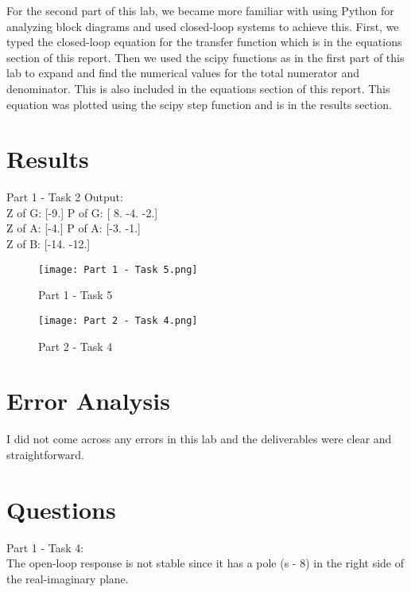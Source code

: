 \documentclass[12pt]{report}
\begin{document}
\noindent For the second part of this lab, we became more familiar with using Python for analyzing block diagrams and used closed-loop systems to achieve this. First, we typed the closed-loop equation for the transfer function which is in the equations section of this report. Then we used the scipy functions as in the first part of this lab to expand and find the numerical values for the total numerator and denominator. This is also included in the equations section of this report. This equation was plotted using the scipy step function and is in the results section. 

\newpage
\section{Results}

Part 1 - Task 2 Output:\\

Z of G:  [-9.]   \indent P of G:  [ 8. -4. -2.]\\
\indent Z of A:  [-4.] \indent  P of A:  [-3. -1.]\\
\indent Z of B:  [-14. -12.]\\

\begin{figure}[ht]
\begin{center}
\texttt{[image: Part 1 - Task 5.png]}
\caption{Part 1 - Task 5}
\end{center}
\end{figure}
\clearpage

\begin{figure}[ht]
\begin{center}
\texttt{[image: Part 2 - Task 4.png]}
\caption{Part 2 - Task 4}
\end{center}
\end{figure}
\clearpage


\section{Error Analysis}
I did not come across any errors in this lab and the deliverables were clear and straightforward. 

\section{Questions}
Part 1 - Task 4:\\

The open-loop response is not stable since it has a pole (s - 8) in the right side of the real-imaginary plane. \\
\end{document}
